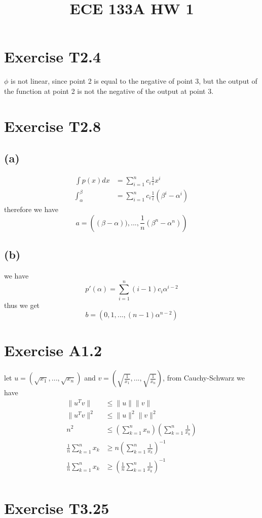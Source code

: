 
\title{ECE 133A HW 1}

\maketitle
\section*{Exercise T2.4}
$\phi$ is not linear, since point 2 is equal to the negative of point 3, but the output of the function
at point 2 is not the negative of the output at point 3.
\section*{Exercise T2.8}
\subsection*{(a)}
\begin{align*}
\int p(x)dx&=\sum_{i=1}^{n}c_i\frac{1}{i}x^{i}\\
\int_{\alpha}^\beta&=\sum_{i=1}^{n}c_i\frac{1}{i}(\beta^i-\alpha^i)
\end{align*}
therefore we have
$$a=\boxed{\left((\beta-\alpha)),...,\frac{1}{n}(\beta^n-\alpha^n)\right)}$$
\subsection*{(b)}
we have
$$p'(\alpha)=\sum_{i=1}^{n}(i-1)c_i \alpha^{i-2}$$
thus we get
$$b=\boxed{\left(0,1,...,(n-1)\alpha^{n-2}\right)}$$
\section*{Exercise A1.2}
let $u=(\sqrt{x_1},...,\sqrt{x_n})$ and $v=\left(\sqrt{\frac{1}{x_1}},...,\sqrt{\frac{1}{x_n}}\right)$, from Cauchy-Schwarz we have
\begin{align*}
	\|u^Tv\|&\leq \|u\|\|v\|\\
	\|u^Tv\|^2&\leq \|u\|^2\|v\|^2\\
	n^2&\leq\left(\sum_{k=1}^{n}x_n\right)\left(\sum_{k=1}^{n}\frac{1}{x_k}\right)\\
	\frac{1}{n}\sum_{k=1}^{n}x_k&\geq n\left(\sum_{k=1}^n\frac{1}{x_k}\right)^{-1}\\
	\frac{1}{n}\sum_{k=1}^{n}x_k&\geq\left(\frac{1}{n}\sum_{k=1}^n\frac{1}{x_k}\right)^{-1}\\
\end{align*}
\section*{Exercise T3.25}
